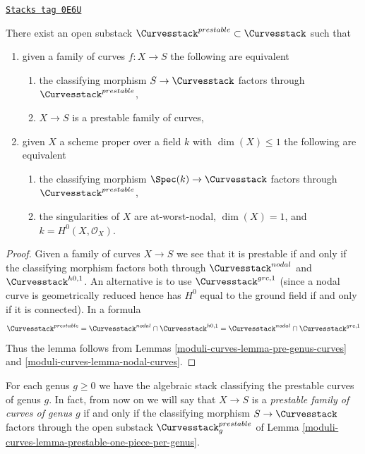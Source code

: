 \begin{lemma}
\label{moduli-curves-lemma-prestable-curves}
\href{https://stacks.math.columbia.edu/tag/0E6U}{\texttt{Stacks tag 0E6U}}

There exist an open substack $\Curvesstack^{prestable} \subset \Curvesstack$
such that
\begin{enumerate}
\item given a family of curves $f : X \to S$ the following are equivalent
\begin{enumerate}
\item the classifying morphism $S \to \Curvesstack$ factors
through $\Curvesstack^{prestable}$,
\item $X \to S$ is a prestable family of curves,
\end{enumerate}
\item given $X$ a scheme proper over a field $k$ with
$\dim(X) \leq 1$ the following are equivalent
\begin{enumerate}
\item the classifying morphism $\Spec(k) \to \Curvesstack$
factors through $\Curvesstack^{prestable}$,
\item the singularities of $X$ are at-worst-nodal, $\dim(X) = 1$,
and $k = H^0(X, \mathcal{O}_X)$.
\end{enumerate}
\end{enumerate}
\end{lemma}

\begin{proof}
Given a family of curves $X \to S$ we see that it is prestable if
and only if the classifying morphism factors both through
$\Curvesstack^{nodal}$ and $\Curvesstack^{h0, 1}$. An alternative
is to use $\Curvesstack^{grc, 1}$ (since a nodal curve is geometrically
reduced hence has $H^0$ equal to the ground field if and only if
it is connected). In a formula
$$
\Curvesstack^{prestable} =
\Curvesstack^{nodal} \cap \Curvesstack^{h0, 1} =
\Curvesstack^{nodal} \cap \Curvesstack^{grc, 1}
$$
Thus the lemma follows from
Lemmas \ref{moduli-curves-lemma-pre-genus-curves} and \ref{moduli-curves-lemma-nodal-curves}.
\end{proof}

For each genus $g \geq 0$ we have the algebraic stack classifying
the prestable curves of genus $g$. In fact, from now on we will say
that $X \to S$ is a {\it prestable family of curves of genus $g$}
if and only if the classifying morphism $S \to \Curvesstack$ factors through
the open substack $\Curvesstack^{prestable}_g$ of
Lemma \ref{moduli-curves-lemma-prestable-one-piece-per-genus}.

